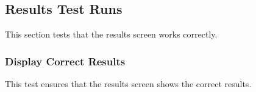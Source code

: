 \subsection{Results Test Runs} %
\label{sub:results_test_runs}
This section tests that the results screen works correctly.
\subsubsection{Display Correct Results} %
\label{ssub:display_correct_results}
This test ensures that the results screen shows the correct results.
